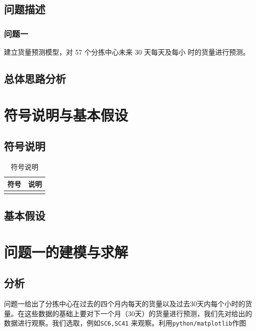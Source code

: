 \documentclass[UTF8,a4paper,10 pt]{article}%
\begin{document}
\subsection{问题描述}
\subsubsection{问题一}
建立货量预测模型，对 57 个分拣中心未来 30 天每天及每小
时的货量进行预测。


\subsection{总体思路分析}



\clearpage
\section{符号说明与基本假设}
\subsection{符号说明}

\begin{table}[!ht]
\caption{符号说明}%
\centering%
\begin{tabular}{p{4cm}<{\centering}p{8cm}<{\centering}}%
\toprule%
符号&说明 \\
\midrule%
&\\
\bottomrule%

\end{tabular}
\end{table}

\subsection{基本假设}

\clearpage
\section{问题一的建模与求解}
\subsection{分析}
问题一给出了分拣中心在过去的四个月内每天的货量以及过去30天内每个小时的货量。在这些数据的基础上要对下一个月（30天）的货量进行预测，我们先对给出的数据进行观察。我们选取，例如{\tt SC6,SC41} 来观察。利用{\tt python/matplotlib}作图
\end{document}
